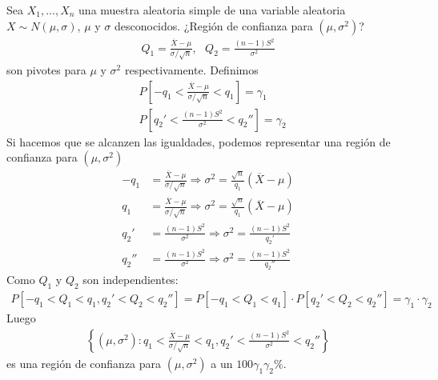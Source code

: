 \begin{ejemplo}
Sea $X_1,...,X_n$ una muestra aleatoria simple de una variable aleatoria $X \sim N(\mu,\sigma)$, $\mu$ y $\sigma$ desconocidos. ¿Región de confianza para $(\mu,\sigma^2)$?
\begin{align*}
    Q_1 = \frac{\overline{X} - \mu}{\sigma/\sqrt{n}}, \ \ \ Q_2 = \frac{(n-1)S^2}{\sigma^2}
\end{align*}
son pivotes para $\mu$ y $\sigma^2$ respectivamente. Definimos
\begin{align*}
    &P\left[-q_1 < \frac{\overline{X} - \mu}{\sigma/\sqrt{n}} < q_1\right] = \gamma_1 \\
    &P\left[q_2' < \frac{(n-1)S^2}{\sigma^2} < q_2''\right] = \gamma_2
\end{align*}
Si hacemos que se alcanzen las igualdades, podemos representar una región de confianza para $(\mu,\sigma^2)$
\begin{align*}
     -q_1 &=  \frac{\overline{X} - \mu}{\sigma/\sqrt{n}} \Longrightarrow \sigma^2 = \frac{\sqrt{n}}{q_1}(\overline{X} - \mu)\\
     q_1 &= \frac{\overline{X} - \mu}{\sigma/\sqrt{n}} \Longrightarrow \sigma^2 = \frac{\sqrt{n}}{q_1}(\overline{X} - \mu) \\
     q_2' &= \frac{(n-1)S^2}{\sigma^2} \Longrightarrow \sigma^2 = \frac{(n-1)S^2}{q_2'}\\
     q_2'' &= \frac{(n-1)S^2}{\sigma^2} \Longrightarrow \sigma^2 = \frac{(n-1)S^2}{q_2''}
\end{align*}
Como $Q_1$ y $Q_2$ son independientes:
\begin{align*}
    P[-q_1 < Q_1 < q_1, q_2' < Q_2 < q_2''] = P[-q_1 < Q_1 < q_1] \cdot P[ q_2' < Q_2 < q_2''] = \gamma_1 \cdot \gamma_2
\end{align*}
Luego
\begin{align*}
    \left\{  (\mu,\sigma^2) : q_1 < \frac{\overline{X} - \mu}{\sigma/\sqrt{n}}< q_1, q_2' < \frac{(n-1)S^2}{\sigma^2} < q_2''\right\}
\end{align*}
es una región de confianza para $(\mu,\sigma^2)$ a un $100\gamma_1 \gamma_2 \%$.
\end{ejemplo}

